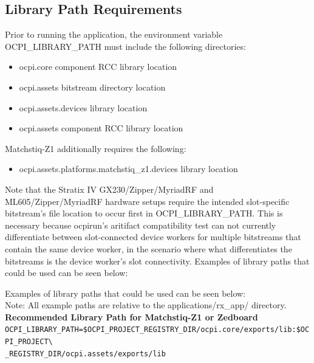 \subsection{Library Path Requirements}
\noindent Prior to running the application, the environment variable OCPI\_LIBRARY\_PATH must include the following directories:\par\medskip
	\begin{itemize}
		\item ocpi.core component RCC library location
		\item ocpi.assets bitstream directory location
		\item ocpi.assets.devices library location
		\item ocpi.assets component RCC library location
	\end{itemize}
Matchstiq-Z1 additionally requires the following:
	\begin{itemize}
		\item ocpi.assets.platforms.matchstiq\_z1.devices library location
	\end{itemize}

\noindent Note that the Stratix IV GX230/Zipper/MyriadRF and ML605/Zipper/MyriadRF hardware setups require the intended slot-specific bitstream's file location to occur first in OCPI\_LIBRARY\_PATH. This is necessary because ocpirun's aritifact compatibility test can not currently differentiate between slot-connected device workers for multiple bitstreams that contain the same device worker, in the scenario where what differentiates the bitstreams is the device worker's slot connectivity. Examples of library paths that could be used can be seen below:\par\medskip
\pagebreak

\noindent Examples of library paths that could be used can be seen below:\\

Note: All example paths are relative to the applications/rx\_app/ directory.\\

\noindent\textbf{Recommended Library Path for Matchstiq-Z1 or Zedboard}\\

\noindent
\verb|OCPI_LIBRARY_PATH=$OCPI_PROJECT_REGISTRY_DIR/ocpi.core/exports/lib:$OCPI_PROJECT\| \\
\verb|_REGISTRY_DIR/ocpi.assets/exports/lib|
\par\medskip


